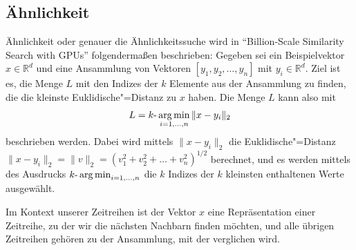 \subsection{Ähnlichkeit}\label{subsec:aehnlichkeit}
Ähnlichkeit oder genauer die Ähnlichkeitssuche wird in "`Billion-Scale Similarity Search with GPUs"' \cite[Ch. 2]{faissAehnlichkeitssuche} folgendermaßen beschrieben: Gegeben sei ein Beispielvektor $x \in \mathbb{R}^d$ und eine Ansammlung von Vektoren $[y_1,y_2,\ldots,y_n]$ mit $y_i \in \mathbb{R}^d$. Ziel ist es, die Menge $L$ mit den Indizes der $k$ Elemente aus der Ansammlung zu finden, die die kleinste Euklidische"=Distanz zu $x$ haben. Die Menge $L$ kann also mit
\[L= k \text{-}\operatorname*{arg\,min}_{i=1,\ldots,n}\|x-y_i\|_2\]
beschrieben werden. Dabei wird mittels $\|x-y_i\|_2$ die Euklidische"=Distanz \\ $\|x-y_i\|_2=\|v\|_2 = (v_1^2+v_2^2+ \ldots +v_n^2)^{1/2}$ berechnet, und es werden mittels  des Ausdrucks $k\text{-}\operatorname*{arg\,min}_{i=1,\ldots,n}$ die $k$ Indizes der $k$ kleinsten enthaltenen Werte ausgewählt.

Im Kontext unserer Zeitreihen ist der Vektor $x$ eine Repräsentation einer Zeitreihe, zu der wir die nächsten Nachbarn finden möchten, und alle übrigen Zeitreihen gehören zu der Ansammlung, mit der verglichen wird.
